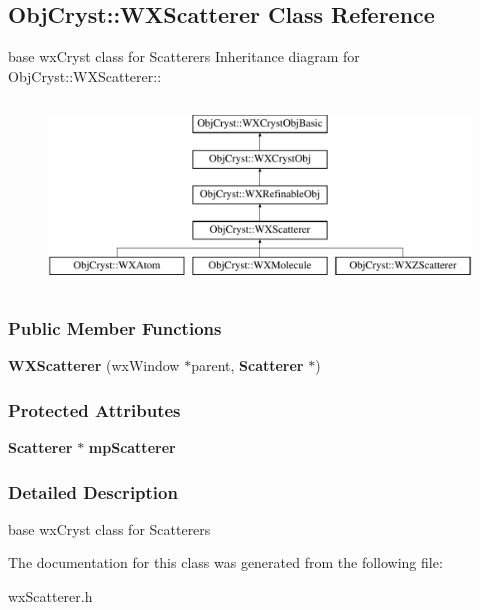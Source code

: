 \subsection{ObjCryst::WXScatterer Class Reference}
\label{a00144}


base wxCryst class for Scatterers  
Inheritance diagram for ObjCryst::WXScatterer::\begin{figure}[H]
\begin{center}
\leavevmode
\includegraphics[height=5cm]{a00144}
\end{center}
\end{figure}
\subsubsection*{Public Member Functions}
\begin{DoxyCompactItemize}
\item 
{\bfseries WXScatterer} (wxWindow $\ast$parent, {\bf Scatterer} $\ast$)\label{a00144_a43a37c79f9dca837a55fe024a06fddd6}

\end{DoxyCompactItemize}
\subsubsection*{Protected Attributes}
\begin{DoxyCompactItemize}
\item 
{\bf Scatterer} $\ast$ {\bfseries mpScatterer}\label{a00144_a60b8f362b1735a8942e2991994d5c862}

\end{DoxyCompactItemize}


\subsubsection{Detailed Description}
base wxCryst class for Scatterers 

The documentation for this class was generated from the following file:\begin{DoxyCompactItemize}
\item 
wxScatterer.h\end{DoxyCompactItemize}
